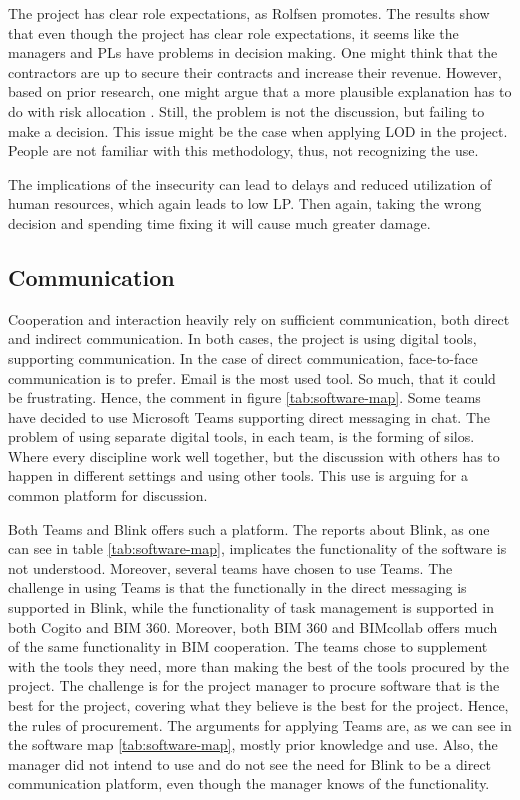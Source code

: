 The project has clear role expectations, as Rolfsen promotes\citep{rolfsen}. The results show that even though the project has clear role expectations, it seems like the managers and PLs have problems in decision making. One might think that the contractors are up to secure their contracts and increase their revenue. However, based on prior research, one might argue that a more plausible explanation has to do with risk allocation \citep{zaghloul2003construction}.  Still, the problem is not the discussion, but failing to make a decision. This issue might be the case when applying LOD in the project. People are not familiar with this methodology, thus, not recognizing the use. 

The implications of the insecurity can lead to delays and reduced utilization of human resources, which again leads to low LP. Then again, taking the wrong decision and spending time fixing it will cause much greater damage. 

\subsection{Communication}
Cooperation and interaction heavily rely on sufficient communication, both direct and indirect communication. In both cases, the project is using digital tools, supporting communication. In the case of direct communication, face-to-face communication is to prefer. Email is the most used tool. So much, that it could be frustrating. Hence, the comment in figure \ref{tab:software-map}. Some teams have decided to use Microsoft Teams supporting direct messaging in chat. The problem of using separate digital tools, in each team, is the forming of silos. Where every discipline work well together, but the discussion with others has to happen in different settings and using other tools. This use is arguing for a common platform for discussion. 

Both Teams and Blink offers such a platform. The reports about Blink, as one can see in table \ref{tab:software-map}, implicates the functionality of the software is not understood. Moreover, several teams have chosen to use Teams. The challenge in using Teams is that the functionally in the direct messaging is supported in Blink, while the functionality of task management is supported in both Cogito and BIM 360. Moreover, both BIM 360 and BIMcollab offers much of the same functionality in BIM cooperation. The teams chose to supplement with the tools they need, more than making the best of the tools procured by the project. The challenge is for the project manager to procure software that is the best for the project, covering what they believe is the best for the project. Hence, the rules of procurement. The arguments for applying Teams are, as we can see in the software map \ref{tab:software-map}, mostly prior knowledge and use. Also, the manager did not intend to use and do not see the need for Blink to be a direct communication platform, even though the manager knows of the functionality. 

